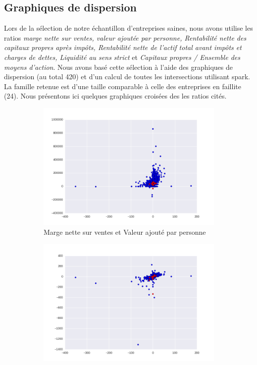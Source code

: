 \documentclass[DIV=calc, paper=a4, fontsize=11pt, twocolumn]{scrartcl}
\begin{document}
\begin{appendices}
\section{Graphiques de dispersion}
Lors de la sélection de notre échantillon d'entreprises saines, nous avons utilise les ratios \emph{marge nette sur ventes, valeur ajoutée par personne, Rentabilité nette des capitaux propres après impôts, Rentabilité nette de l’actif total avant impôts et charges de dettes, Liquidité au sens strict} et \emph{Capitaux propres / Ensemble des moyens d’action}. Nous avons basé cette sélection à l'aide des graphiques de dispersion (au total 420) et d'un calcul de toutes les intersections utilisant spark. La famille retenue est d'une taille comparable à celle des entreprises en faillite (24). Nous présentons ici quelques graphiques croisées des les ratios cités.
\begin{figure}
\captionsetup[subfigure]{labelformat=empty}
\centering
  \begin{subfigure}{.45\textwidth}
    \centering
    \includegraphics[width=\linewidth]{cr2xr4.png}
    \caption{Marge nette sur ventes et Valeur ajouté par personne}
  \end{subfigure}  
  \begin{subfigure}{.45\textwidth}
    \centering
    \includegraphics[width=\linewidth]{cr2xr12.png}

\end{subfigure}
\end{figure}
\end{appendices}
\end{document}
